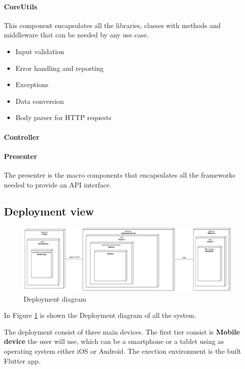 \paragraph{CoreUtils}
This component encapsulates all the libraries, classes with methods and middleware that can be needed by any use case.
\begin{itemize}
  \item Input validation
  \item Error handling and reporting
  \item Exceptions
  \item Data conversion
  \item Body parser for HTTP requests
\end{itemize}


\paragraph{Controller}


\paragraph{Presenter}
The presenter is the macro components that encapsulates all the frameworks needed to provide an API interface.



\subsection{Deployment view}
\begin{figure}[H]
\centering
\includegraphics[width=\textwidth]{Images/DeploymentDiagram1.png}
\caption{\label{fig:deploy} Deployment diagram}
\end{figure}

In Figure \ref{fig:deploy} is shown the Deployment diagram of all the system.

The deployment consist of three main devices. The first tier consist is \textbf{Mobile device} the user will use, which can be a smartphone or a tablet using as operating system either iOS or Android.
The exection environment is the built Flutter app.



